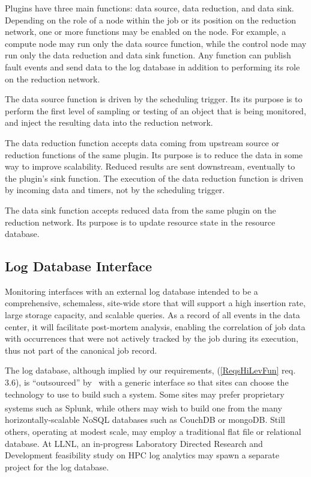 Plugins have three main functions: data source, data reduction,
and data sink.  Depending on the role of a node within the job or
its position on the reduction network,
one or more functions may be enabled on the node.
For example, a compute node may run only the data source function,
while the control node may run only the data reduction and data sink function.
Any function can publish fault events and send data to the log database
in addition to performing its role on the reduction network.

The data source function is driven by the scheduling trigger.
Its its purpose is to perform the first level of sampling or testing
of an object that is being monitored, and inject the resulting data 
into the reduction network.

The data reduction function accepts data coming from upstream source or
reduction functions of the same plugin.
Its purpose is to reduce the data in some way to improve scalability.
Reduced results are sent downstream, eventually to the plugin's sink function.
The execution of the data reduction function is driven by
incoming data and timers, not by the scheduling trigger.

The data sink function accepts reduced data from the same plugin on
the reduction network.
Its purpose is to update resource state in the resource database.

\subsection{Log Database Interface}

Monitoring interfaces with an external log database intended to
be a comprehensive, schemaless, site-wide store that will support a
high insertion rate, large storage capacity, and scalable queries.
As a record of all events in the data center, it will facilitate
post-mortem analysis, enabling the correlation of job data
with occurrences that were not actively tracked by the job during its
execution, thus not part of the canonical job record.

The log database, although implied by our requirements, 
(\ref{ReqsHiLevFun} req. 3.6), is ``outsourced'' by \ngrm\ with
a generic interface so that sites can choose the technology
to use to build such a system.  Some sites may prefer proprietary
systems such as Splunk\textsuperscript{\textregistered}, while others may
wish to build one from the many horizontally-scalable NoSQL databases
such as CouchDB\cite{CouchDB} or mongoDB\cite{MongoDB}.
Still others, operating at modest scale, may employ a traditional flat
file or relational database.  At LLNL, an in-progress Laboratory
Directed Research and Development feasibility study on HPC log
analytics\cite{LogLDRD} may spawn a separate project for the log database.

